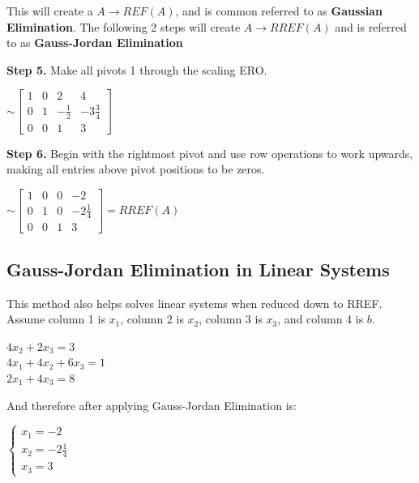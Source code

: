 \documentclass{report}
\begin{document}
This will create a $A \rightarrow REF(A)$, and is common referred to as \textbf{Gaussian Elimination}. The following 2 steps will create $A \rightarrow RREF(A)$ and is referred to as \textbf{Gauss-Jordan Elimination}

\begin{fullindent}{1cm}
	\textbf{Step 5.} Make all pivots 1 through the scaling ERO.
	\begin{center}
		$\sim \begin{bmatrix}
			1 & 0 & 2 & 4 \\
			0 & 1 & -\frac{1}{2} & -3\frac{3}{4} \\
			0 & 0 & 1 & 3
		\end{bmatrix}$
	\end{center}
	\textbf{Step 6.} Begin with the rightmost pivot and use row operations to work upwards, making all entries above pivot positions to be zeros.
	\begin{center}
		$\sim \begin{bmatrix}
			1 & 0 & 0 & -2 \\
			0 & 1 & 0 & -2\frac{1}{4} \\
			0 & 0 & 1 & 3
		\end{bmatrix} = RREF(A)$
	\end{center}
\end{fullindent}

\subsection*{Gauss-Jordan Elimination in Linear Systems}
This method also helps solves linear systems when reduced down to RREF. Assume column 1 is $x_1$, column 2 is $x_2$, column 3 is $x_3$, and column 4 is $b$.
\begin{center}
	$4x_2 + 2x_3 = 3$\\
	$4x_1 + 4x_2 + 6x_3 = 1$\\
	$2x_1 + 4x_3 = 8$
\end{center}

And therefore after applying Gauss-Jordan Elimination is:
\begin{center}
	$\begin{cases}
		x_1 = -2\\
		x_2 = -2\frac{1}{4}\\
		x_3 = 3
	\end{cases}$
\end{center}
\end{document}
